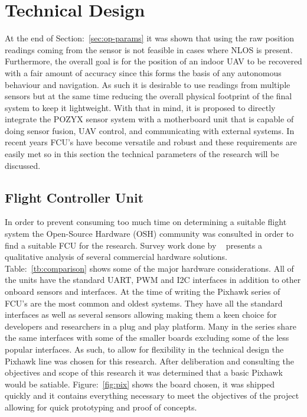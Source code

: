 \section{Technical Design}\label{sec:technical-design}
At the end of Section:~\ref{sec:op-params} it was shown that using the raw position readings coming from the sensor is not feasible in cases where NLOS is present.
Furthermore, the overall goal is for the position of an indoor UAV to be recovered with a fair amount of accuracy since this forms the basis of any autonomous behaviour and navigation.
As such it is desirable to use readings from multiple sensors but at the same time reducing the overall physical footprint of the final system to keep it lightweight.
With that in mind, it is proposed to directly integrate the POZYX sensor system with a motherboard unit that is capable of doing sensor fusion, UAV control, and communicating with external systems.
In recent years FCU's have become versatile and robust and these requirements are easily met so in this section the technical parameters of the research will be discussed.

\subsection{Flight Controller Unit}\label{subsec:flight-controller-unit}
In order to prevent consuming too much time on determining a suitable flight system the Open-Source Hardware (OSH) community was consulted in order to find a suitable FCU for the research.
Survey work done by ~\citet{ebeid2018survey} presents a qualitative analysis of several commercial hardware solutions.
Table:~\ref{tb:comparison} shows some of the major hardware considerations.
All of the units have the standard UART, PWM and I2C interfaces in addition to other onboard sensors and interfaces.
At the time of writing the Pixhawk series of FCU's are the most common and oldest systems.
They have all the standard interfaces as well as several sensors allowing making them a keen choice for developers and researchers in a plug and play platform.
Many in the series share the same interfaces with some of the smaller boards excluding some of the less popular interfaces.
As such, to allow for flexibility in the technical design the Pixhawk line was chosen for this research.
After deliberation and consulting the objectives and scope of this research it was determined that a basic Pixhawk would be satiable.
Figure:~\ref{fig:pix} shows the board chosen, it was shipped quickly and it contains everything necessary to meet the objectives of the project allowing for quick prototyping and proof of concepts.


